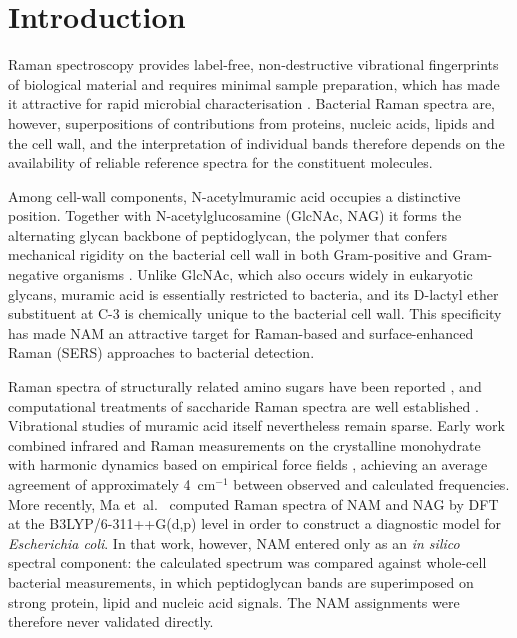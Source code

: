 \documentclass[preprint,12pt]{elsarticle}
\newcommand{\wn}{\ensuremath{\mathrm{cm}^{-1}}}
\begin{document}
\linenumbers

\section{Introduction}

Raman spectroscopy provides label-free, non-destructive vibrational
fingerprints of biological material and requires minimal sample preparation,
which has made it attractive for rapid microbial characterisation
\cite{wang2022bacteria,ma2024ecoli}. Bacterial Raman spectra are, however,
superpositions of contributions from proteins, nucleic acids, lipids and the
cell wall, and the interpretation of individual bands therefore depends on the
availability of reliable reference spectra for the constituent molecules.

Among cell-wall components, N-acetylmuramic acid occupies a distinctive
position. Together with N-acetylglucosamine (GlcNAc, NAG) it forms the
alternating glycan backbone of peptidoglycan, the polymer that confers
mechanical rigidity on the bacterial cell wall in both Gram-positive and
Gram-negative organisms \cite{vollmer2008}. Unlike GlcNAc, which also occurs widely in
eukaryotic glycans, muramic acid is essentially restricted to bacteria, and
its D-lactyl ether substituent at C-3 is chemically unique to the bacterial
cell wall. This specificity has made NAM an attractive target for
Raman-based and surface-enhanced Raman (SERS) approaches to bacterial
detection.

Raman spectra of structurally related amino sugars have been reported
\cite{she1974raman}, and computational treatments of saccharide Raman spectra
are well established \cite{kaminsky2020saccharides}.
Vibrational studies of muramic acid itself nevertheless remain sparse. Early work
combined infrared and Raman measurements on the crystalline monohydrate with
harmonic dynamics based on empirical force fields \cite{kouach1994}, achieving
an average agreement of approximately 4~\wn{} between observed and calculated
frequencies. More recently, Ma et~al.\ \cite{ma2024ecoli} computed Raman
spectra of NAM and NAG by DFT at the B3LYP/6-311++G(d,p) level in order to
construct a diagnostic model for \emph{Escherichia coli}. In that work,
however, NAM entered only as an \emph{in silico} spectral component: the
calculated spectrum was compared against whole-cell bacterial measurements,
in which peptidoglycan bands are superimposed on strong protein, lipid and
nucleic acid signals. The NAM assignments were therefore never validated
directly.
\end{document}
